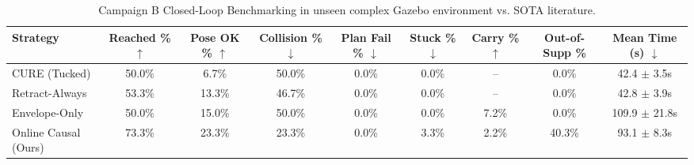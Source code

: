 \begin{table}[t]
\centering
\caption{Campaign B Closed-Loop Benchmarking in unseen complex Gazebo environment vs. SOTA literature.}
\label{tab:campaign_b_sota}
\footnotesize
\begin{tabularx}{\columnwidth}{@{}X c c c c c c c c@{}}
\toprule
\textbf{Strategy} & \textbf{Reached \% $\uparrow$} & \textbf{Pose OK \% $\uparrow$} & \textbf{Collision \% $\downarrow$} & \textbf{Plan Fail \% $\downarrow$} & \textbf{Stuck \% $\downarrow$} & \textbf{Carry \% $\uparrow$} & \textbf{Out-of-Supp \%} & \textbf{Mean Time (s) $\downarrow$} \\
\midrule
CURE (Tucked) & 50.0\% & 6.7\% & 50.0\% & 0.0\% & 0.0\% & -- & 0.0\% & 42.4 $\pm$ 3.5s \\
Retract-Always & 53.3\% & 13.3\% & 46.7\% & 0.0\% & 0.0\% & -- & 0.0\% & 42.8 $\pm$ 3.9s \\
Envelope-Only & 50.0\% & 15.0\% & 50.0\% & 0.0\% & 0.0\% & 7.2\% & 0.0\% & 109.9 $\pm$ 21.8s \\
Online Causal (Ours) & 73.3\% & 23.3\% & 23.3\% & 0.0\% & 3.3\% & 2.2\% & 40.3\% & 93.1 $\pm$ 8.3s \\
\bottomrule
\end{tabularx}
\end{table}
